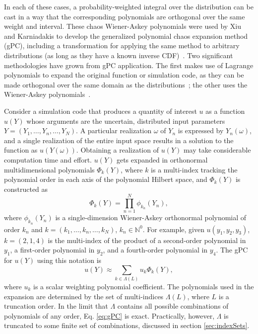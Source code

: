 In each of these cases, a probability-weighted
integral over the distribution can be cast in a way that the corresponding polynomials are orthogonal over the
same weight and interval.  These chaos Wiener-Askey polynomials were used by Xiu and Karniadakis to develop
the generalized polynomial chaos expansion method (gPC), including a transformation for applying the same
method to arbitrary distributions (as long as they have a known inverse CDF)~\cite{xiu}.  Two significant
methodologies have grown from gPC application.  The first makes use of Lagrange polynomials to expand the
original function or simulation code, as they can be made orthogonal over the same domain as the
distributions~\cite{SCLagrange}; the other uses the Wiener-Askey polynomials~\cite{xiu}. 

Consider a simulation code that produces a quantity of interest $u$ as a function $u(Y)$ whose arguments are
the uncertain, distributed input
parameters $Y=(Y_1,\ldots,Y_n,\ldots,Y_N)$.  A particular realization $\omega$ of $Y_n$ is expressed by
$Y_n(\omega)$, and a single realization of the entire input space results in a solution to the function as
$u(Y(\omega))$. Obtaining a realization of $u(Y)$ may take considerable computation time and
effort.
$u(Y)$ gets expanded in orthonormal multidimensional polynomials $\Phi_k(Y)$, where $k$ is a multi-index tracking
the polynomial order in each axis of the polynomial Hilbert space, and $\Phi_k(Y)$ is constructed as
\begin{equation}\label{eq:gPC}
  \Phi_k(Y) = \prod_{n=1}^N \phi_{k_n}(Y_n),
\end{equation}
where $\phi_{k_n}(Y_n)$ is a single-dimension Wiener-Askey orthonormal polynomial of order $k_n$ and
$k=(k_1,\ldots,k_n,\ldots,k_N)$, $k_n\in\mathbb{N}^0$.  For example, given $u(y_1,y_2,y_3)$, $k=(2,1,4)$ 
is the multi-index of the
product of a second-order polynomial in $y_1$, a first-order polynomial in $y_2$, and a fourth-order
polynomial in $y_4$. The gPC for $u(Y)$ using this notation is
\begin{equation}
  u(Y) \approx \sum_{k\in\Lambda(L)} u_k\Phi_k(Y),
\end{equation}
where $u_k$ is a scalar weighting polynomial coefficient. The polynomials used in the expansion are determined
by the set of multi-indices $\Lambda(L)$, where $L$ is a truncation order.  In the limit
that $\Lambda$ contains all possible combinations of polynomials of any order, Eq. \ref{eq:gPC} is exact.
Practically, however, $\Lambda$ is truncated to some finite set of combinations, discussed in section
\ref{sec:indexSets}.


